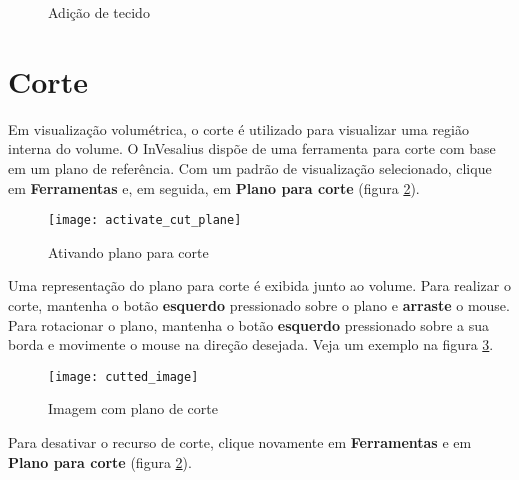 \begin{figure}[!htb]
  \centering
  \hfill
  \hfill  
  \caption{Adição de tecido}
  \label{fig:raycasting_add}
\end{figure}

\newpage


\section{Corte}

Em visualização volumétrica, o corte é utilizado para visualizar uma região interna do volume.
O InVesalius dispõe de uma ferramenta para corte com base em um plano de referência. Com
um padrão de visualização selecionado, clique em \textbf{Ferramentas} e, em seguida, em
\textbf{Plano para corte} (figura \ref{fig:activate_cut_plane}).

\begin{figure}[!htb]
\centering
\texttt{[image: activate\_cut\_plane]}
\caption{Ativando plano para corte}
\label{fig:activate_cut_plane}
\end{figure}

Uma representação do plano para corte é exibida junto ao volume. Para realizar o corte,
mantenha o botão \textbf{esquerdo} pressionado sobre o plano e \textbf{arraste} o mouse.
Para rotacionar o plano, mantenha o botão \textbf{esquerdo} pressionado sobre a sua borda
e movimente o mouse na direção desejada. Veja um exemplo na figura \ref{fig:cutted_image}.

\begin{figure}[!htb]
\centering
\texttt{[image: cutted\_image]}
\caption{Imagem com plano de corte}
\label{fig:cutted_image}
\end{figure}

Para desativar o recurso de corte, clique novamente em \textbf{Ferramentas} e em
\textbf{Plano para corte} (figura \ref{fig:activate_cut_plane}).
